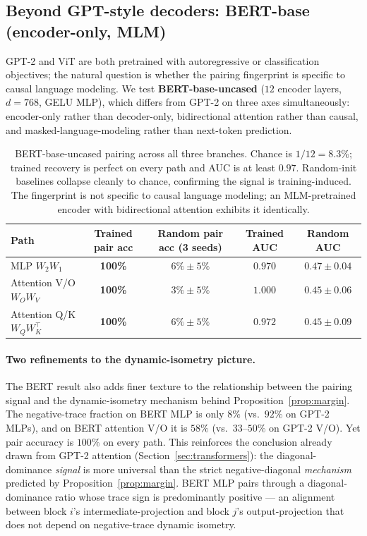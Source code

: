\documentclass[10pt]{article}
\theoremstyle{remark}
\begin{document}
\subsection{Beyond GPT-style decoders: BERT-base (encoder-only, MLM)}\label{sec:bert}

GPT-2 and ViT are both pretrained with autoregressive or
classification objectives; the natural question is whether the pairing
fingerprint is specific to causal language modeling. We test
\textbf{BERT-base-uncased} ($12$ encoder layers, $d{=}768$, GELU MLP),
which differs from GPT-2 on three axes simultaneously: encoder-only
rather than decoder-only, bidirectional attention rather than causal,
and masked-language-modeling rather than next-token prediction.

\begin{table}[H]
\centering
\small
\renewcommand{\arraystretch}{1.15}
\begin{tabular}{lcccc}
\toprule
Path & Trained pair acc & Random pair acc (3 seeds) & Trained AUC & Random AUC \\
\midrule
MLP  $W_2 W_1$              & \textbf{100\%} & $6\% \pm 5\%$  & $0.970$ & $0.47 \pm 0.04$ \\
Attention V/O $W_O W_V$     & \textbf{100\%} & $3\% \pm 5\%$  & $\mathbf{1.000}$ & $0.45 \pm 0.06$ \\
Attention Q/K $W_Q W_K^\top$ & \textbf{100\%} & $6\% \pm 5\%$  & $0.972$ & $0.45 \pm 0.09$ \\
\bottomrule
\end{tabular}
\caption{BERT-base-uncased pairing across all three branches.
Chance is $1/12 = 8.3\%$; trained recovery is perfect on every path
and AUC is at least $0.97$. Random-init baselines collapse cleanly
to chance, confirming the signal is training-induced. The fingerprint
is not specific to causal language modeling; an MLM-pretrained
encoder with bidirectional attention exhibits it identically.}
\label{tab:bert}
\end{table}

\paragraph{Two refinements to the dynamic-isometry picture.} The BERT
result also adds finer texture to the relationship between the pairing
signal and the dynamic-isometry mechanism behind
Proposition~\ref{prop:margin}. The negative-trace fraction on BERT MLP
is only $8\%$ (vs.\ $92\%$ on GPT-2 MLPs), and on BERT attention V/O
it is $58\%$ (vs.\ $33$--$50\%$ on GPT-2 V/O). Yet pair accuracy is
$100\%$ on every path. This reinforces the conclusion already drawn
from GPT-2 attention (Section~\ref{sec:transformers}): the
diagonal-dominance \emph{signal} is more universal than the strict
negative-diagonal \emph{mechanism} predicted by Proposition~\ref{prop:margin}.
BERT MLP pairs through a diagonal-dominance ratio whose trace sign is
predominantly positive --- an alignment between block $i$'s
intermediate-projection and block $j$'s output-projection that does
not depend on negative-trace dynamic isometry.
\end{document}
